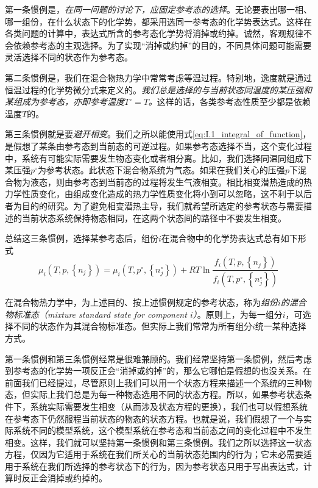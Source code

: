 \documentclass[main.tex]{subfiles}
\begin{document}
第一条惯例是，\emph{在同一问题的讨论下，应固定参考态的选择}。无论要表出哪一相、哪一组份，在什么状态下的化学势，都采用选同一参考态的化学势表达式。这样在各类问题的计算中，表达式所含的参考态化学势将消掉或约掉。诚然，客观规律不会依赖参考态的主观选择。为了实现“消掉或约掉”的目的，不同具体问题可能需要灵活选择不同的状态作为参考态。

第二条惯例是，我们在混合物热力学中常常考虑等温过程。特别地，逸度就是通过恒温过程的化学势微分式来定义的。\emph{我们总是选择的与当前状态同温度的某压强和某组成为参考态，亦即参考温度$T^\circ=T$。}这样的话，各类参考态性质至少都是依赖温度$T$的。

第三条惯例就是要\emph{避开相变}。我们之所以能使用式\eqref{eq:I.1_integral_of_function}，是假想了某条由参考态到当前态的可逆过程。如果参考态选择不当，这个变化过程中，系统有可能实际需要发生物态变化或者相分离。比如，我们选择同温同组成下某压强$p^\circ$为参考状态。此状态下混合物系统为气态。如果在我们关心的压强$p$下混合物为液态，则由参考态到当前态的过程将发生气液相变。相比相变潜热造成的热力学性质变化，由组成变化造成的热力学性质变化将小到可以忽略，这不利于以后者为目的的研究。为了避免相变潜热主导，我们就希望所选定的参考状态与需要描述的当前状态系统保持物态相同，在这两个状态间的路径中不要发生相变。

总结这三条惯例，选择某参考态后，组份$i$在混合物中的化学势表达式总有如下形式
\begin{equation}\label{eq:II.4_mu_standard_state}
  \mu_i\left(T,p,\left\{n_j\right\}\right)=\mu_i\left(T,p^\circ,\left\{n_j^\circ\right\}\right)+RT\ln\frac{f_i\left(T,p,\left\{n_j\right\}\right)}{f_i\left(T,p^\circ,\left\{n_j^\circ\right\}\right)}
\end{equation}

在混合物热力学中，为上述目的、按上述惯例规定的参考状态，称为\emph{组份$i$的混合物标准态（mixture standard state for component $i$）}。原则上，为每一组分$i$，可选择不同的状态作为其混合物标准态。但实际上我们常常为所有组分$i$统一某种选择方式。

第一条惯例和第三条惯例经常是很难兼顾的。我们经常坚持第一条惯例，然后考虑到参考态的化学势一项反正会“消掉或约掉”的，那么它哪怕是假想的也没关系。在前面我们已经提过，尽管原则上我们可以用一个状态方程来描述一个系统的三种物态，但实际上我们总是为每一种物态选用不同的状态方程。所以，如果参考状态条件下，系统实际需要发生相变（从而涉及状态方程的更换），我们也可以假想系统在参考态下仍然服程当前状态的物态的状态方程。也就是说，我们假想了一个与实际系统不同的模型系统，这个模型系统在参考态和当前态之间的变化过程中不发生相变。这样，我们就可以坚持第一条惯例和第三条惯例。我们之所以选择这一状态方程，仅因为它适用于系统在我们所关心的当前状态范围内的行为；它未必需要适用于系统在我们所选择的参考状态下的行为，因为参考状态只用于写出表达式，计算时反正会消掉或约掉的。
\end{document}
